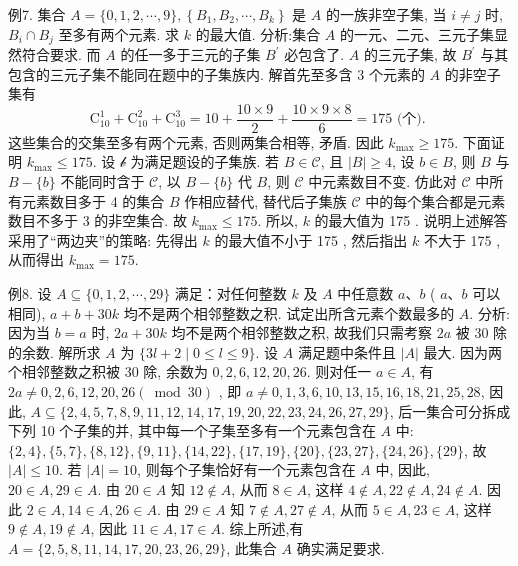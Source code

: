 例7. 集合 $A=\{0,1,2, \cdots, 9\},\left\{B_1, B_2, \cdots, B_k\right\}$ 是 $A$ 的一族非空子集, 当 $i \neq j$ 时, $B_i \cap B_j$ 至多有两个元素.
求 $k$ 的最大值.
分析:集合 $A$ 的一元、二元、三元子集显然符合要求.
而 $A$ 的任一多于三元的子集 $B^{\prime}$ 必包含了.
$A$ 的三元子集, 故 $B^{\prime}$ 与其包含的三元子集不能同在题中的子集族内.
解首先至多含 3 个元素的 $A$ 的非空子集有
$$
\mathrm{C}_{10}^1+\mathrm{C}_{10}^2+\mathrm{C}_{10}^3=10+\frac{10 \times 9}{2}+\frac{10 \times 9 \times 8}{6}=175 \text { (个). }
$$
这些集合的交集至多有两个元素, 否则两集合相等, 矛盾.
因此 $k_{\max } \geqslant 175$.
下面证明 $k_{\max } \leqslant 175$.
设 $\mathscr{b}$ 为满足题设的子集族.
若 $B \in \mathscr{C}$, 且 $|B| \geqslant 4$, 设 $b \in B$, 则 $B$ 与 $B- \{b\}$ 不能同时含于 $\mathscr{C}$, 以 $B-\{b\}$ 代 $B$, 则 $\mathscr{C}$ 中元素数目不变.
仿此对 $\mathscr{C}$ 中所有元素数目多于 4 的集合 $B$ 作相应替代, 替代后子集族 $\mathscr{C}$ 中的每个集合都是元素数目不多于 3 的非空集合.
故 $k_{\max } \leqslant 175$.
所以, $k$ 的最大值为 175 .
说明上述解答采用了“两边夹”的策略: 先得出 $k$ 的最大值不小于 175 , 然后指出 $k$ 不大于 175 , 从而得出 $k_{\max }=175$.



例8. 设 $A \subseteq\{0,1,2, \cdots, 29\}$ 满足：对任何整数 $k$ 及 $A$ 中任意数 $a 、 b$ ( $a 、 b$ 可以相同), $a+b+30 k$ 均不是两个相邻整数之积.
试定出所含元素个数最多的 $A$.
分析:因为当 $b=a$ 时, $2 a+30 k$ 均不是两个相邻整数之积, 故我们只需考察 $2 a$ 被 30 除的余数.
解所求 $A$ 为 $\{3 l+2 \mid 0 \leqslant l \leqslant 9\}$.
设 $A$ 满足题中条件且 $|A|$ 最大.
因为两个相邻整数之积被 30 除, 余数为 $0,2,6,12,20,26$. 则对任一 $a \in A$, 有 $2 a \neq 0,2,6,12,20,26(\bmod 30)$ ,
即 $a \neq 0,1,3,6,10,13,15,16,18,21,25,28$, 因此, $A \subseteq\{2,4,5,7,8,9,11,12,14,17,19,20,22,23,24,26,27,29\}$, 后一集合可分拆成下列 10 个子集的并, 其中每一个子集至多有一个元素包含在 $A$ 中: $\{2,4\}, \{5,7\},\{8,12\},\{9,11\},\{14,22\},\{17,19\},\{20\},\{23,27\},\{24,26\},\{29\}$, 故 $|A| \leqslant 10$.
若 $|A|=10$, 则每个子集恰好有一个元素包含在 $A$ 中, 因此, $20 \in A, 29 \in A$.
由 $20 \in A$ 知 $12 \notin A$, 从而 $8 \in A$, 这样 $4 \notin A, 22 \notin A, 24 \notin A$. 因此 $2 \in A, 14 \in A, 26 \in A$.
由 $29 \in A$ 知 $7 \notin A, 27 \notin A$, 从而 $5 \in A, 23 \in A$, 这样 $9 \notin A, 19 \notin A$, 因此 $11 \in A, 17 \in A$.
综上所述,有 $A=\{2,5,8,11,14,17,20,23,26,29\}$, 此集合 $A$ 确实满足要求.



